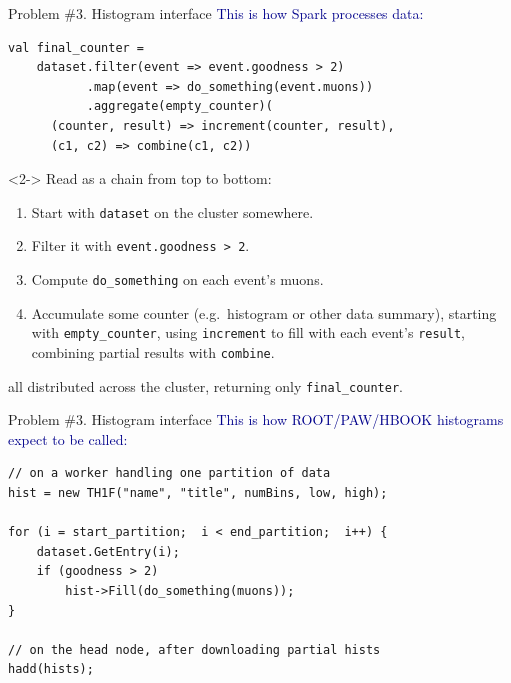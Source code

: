\documentclass{beamer}
\begin{document}
\begin{frame}[fragile]{Problem \#3. Histogram interface}
\vspace{0.4 cm}
\textcolor{darkblue}{This is how Spark processes data:}

\small
\begin{verbatim}
val final_counter =
    dataset.filter(event => event.goodness > 2)
           .map(event => do_something(event.muons))
           .aggregate(empty_counter)(
      (counter, result) => increment(counter, result),
      (c1, c2) => combine(c1, c2))
\end{verbatim}

\begin{uncoverenv}<2->
Read as a chain from top to bottom:
\begin{enumerate}\setlength{\itemsep}{-0.1 cm}
\item Start with {\tt\small dataset} on the cluster somewhere.
\item Filter it with {\tt\small event.goodness > 2}.
\item Compute {\tt\small do\_something} on each event's muons.
\item Accumulate some counter (e.g.\ histogram or other data summary), starting with {\tt\small empty\_counter}, using {\tt\small increment} to fill with each event's {\tt\small result}, combining partial results with {\tt\small combine}.
\end{enumerate}
all distributed across the cluster, returning only {\tt\small final\_counter}.
\end{uncoverenv}
\end{frame}

\begin{frame}[fragile]{Problem \#3. Histogram interface}
\vspace{0.4 cm}
\textcolor{darkblue}{This is how ROOT/PAW/HBOOK histograms expect to be called:}

\small
\begin{verbatim}
// on a worker handling one partition of data
hist = new TH1F("name", "title", numBins, low, high);

for (i = start_partition;  i < end_partition;  i++) {
    dataset.GetEntry(i);
    if (goodness > 2)
        hist->Fill(do_something(muons));
}

// on the head node, after downloading partial hists
hadd(hists);
\end{verbatim}
\end{frame}
\end{document}
